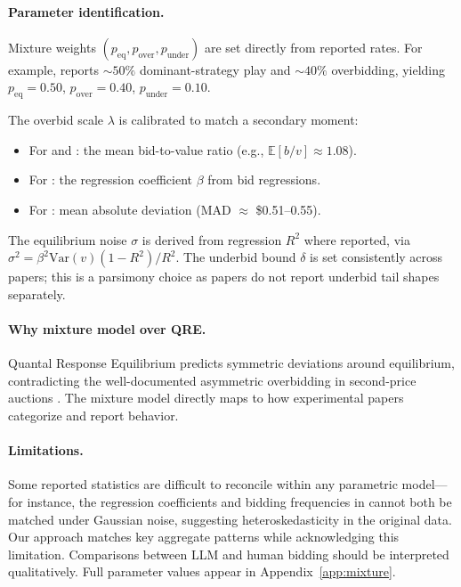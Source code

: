 \paragraph{Parameter identification.}
Mixture weights $(p_{\text{eq}}, p_{\text{over}}, p_{\text{under}})$ are set directly from reported rates. For example, \citet{li2017obviously} reports ${\sim}50\%$ dominant-strategy
play and ${\sim}40\%$ overbidding, yielding $p_{\text{eq}} = 0.50$, $p_{\text{over}} = 0.40$, $p_{\text{under}} = 0.10$.

The overbid scale $\lambda$ is calibrated to match a secondary moment:
\begin{itemize}
  \item For \citet{li2017obviously} and \citet{breitmoser2022obviousness}: the mean bid-to-value ratio (e.g., $\mathbb{E}[b/v] \approx 1.08$).
  \item For \citet{kagel1993independent}: the regression coefficient $\beta$ from bid regressions.
  \item For \citet{gonczarowski2023strategyproofness}: mean absolute deviation (MAD $\approx$ \$0.51--0.55).
\end{itemize}
The equilibrium noise $\sigma$ is derived from regression $R^2$ where reported, via $\sigma^2 = \beta^2 \text{Var}(v)(1-R^2)/R^2$. The underbid bound $\delta$ is set consistently across
papers; this is a parsimony choice as papers do not report underbid tail shapes separately.

\paragraph{Why mixture model over QRE.}
Quantal Response Equilibrium predicts symmetric deviations around equilibrium, contradicting the well-documented asymmetric overbidding in second-price auctions
\citep{kagel1993independent}. The mixture model directly maps to how experimental papers categorize and report behavior.

\paragraph{Limitations.}
Some reported statistics are difficult to reconcile within any parametric model---for instance, the regression coefficients and bidding frequencies in \citet{kagel1993independent}
cannot both be matched under Gaussian noise, suggesting heteroskedasticity in the original data. Our approach matches key aggregate patterns while acknowledging this limitation.
Comparisons between LLM and human bidding should be interpreted qualitatively. Full parameter values appear in Appendix~\ref{app:mixture}.


